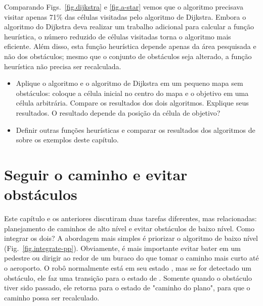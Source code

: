 {Comparando Figs.~\ref{fig.dijkstra} e \ref{fig.a-star} vemos que o algoritmo \astar{} precisava visitar apenas 71\% das células visitadas pelo algoritmo de Dijkstra. Embora o algoritmo \astar{} do Dijkstra deva realizar um trabalho adicional para calcular a função heurística, o número reduzido de células visitadas torna o algoritmo mais eficiente. Além disso, esta função heurística depende apenas da área pesquisada e não dos obstáculos; mesmo que o conjunto de obstáculos seja alterado, a função heurística não precisa ser recalculada.

\begin{framed}
\begin{itemize}
\item Aplique o algoritmo \astar{} e o algoritmo de Dijkstra em um pequeno mapa sem obstáculos: coloque a célula inicial no centro do mapa e o objetivo em uma célula arbitrária. Compare os resultados dos dois algoritmos. Explique seus resultados. O resultado depende da posição da célula de objetivo?
\item Definir outras funções heurísticas e comparar os resultados dos algoritmos de \astar{} sobre os exemplos deste capítulo.
\end{itemize}
\end{framed}

\section{Seguir o caminho e evitar obstáculos}\label{s.path-and-obstacle}

Este capítulo e os anteriores discutiram duas tarefas diferentes, mas relacionadas: planejamento de caminhos de alto nível e evitar obstáculos de baixo nível. Como integrar os dois? A abordagem mais simples é priorizar o algoritmo de baixo nível (Fig.~\ref{fig.integrate-pp}). Obviamente, é mais importante evitar bater em um pedestre ou dirigir ao redor de um buraco do que tomar o caminho mais curto até o aeroporto. O robô normalmente está em seu estado , mas se for detectado um obstáculo, ele faz uma transição para o estado de . Somente quando o obstáculo tiver sido passado, ele retorna para o estado de "caminho do plano", para que o caminho possa ser recalculado.

}
